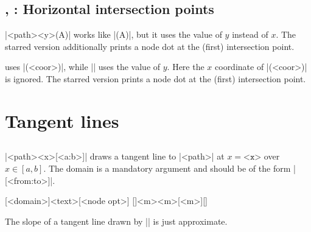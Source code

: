 \subsection{\protect\cmd{\tzhXpointat(*)}, \protect\cmd{\tzhXpoint(*)}: Horizontal intersection points}
\label{ssi:tzhXpoint}

\icmd{\tzhXpointat}|{<path>}{<y>}(A)| works like |(A)|, but it uses the value of $y$ instead of $x$.
The starred version \icmd{\tzhXpointat*} additionally prints a node dot at the (first) intersection point.

\icmd{\tzhXpoint} uses |(<coor>)|, while |\tzhXpointat| uses the value of $y$.
Here the $x$ coordinate of |(<coor>)| is ignored.
The starred version \icmd{\tzhXpoint*} prints a node dot at the (first) intersection point.

\begin{tzcode}{.3}
\end{tzcode}




\section{Tangent lines}
\label{si:tangentlines}

\subsection{\protect\cmd{\tztangentat}}
\label{ssi:tztangentat}

\icmd{\tztangentat}|{<path>}{<x>}[<a:b>]| draws a tangent line to |<path>| at $x=\texttt{<x>}$ over $x\in [a,b]$.
The domain is a mandatory argument and should be of the form |[<from:to>]|.

\begin{tzdef}{}
[<domain>]{<text>}[<node opt>]
  []{<m>}{<m>}[<m>]{}[]
\end{tzdef}


\remark
The slope of a tangent line drawn by |\tztangentat| is just approximate.

